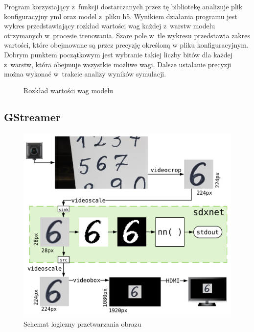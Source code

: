 \documentclass[12pt, oneside, a4paper]{article}
\begin{document}
Program korzystający z~funkcji dostarczanych przez tę bibliotekę
analizuje plik konfiguracyjny yml oraz model z~pliku h5.
Wynikiem działania programu jest wykres przedstawiający
rozkład wartości wag każdej z~warstw modelu otrzymanych w~procesie trenowania.
Szare pole w~tle wykresu
przedstawia zakres wartości, które obejmowane są przez precyzję określoną
w pliku konfiguracyjnym. Dobrym punktem początkowym jest wybranie takiej
liczby bitów dla każdej z~warstw, która obejmuje wszystkie możliwe wagi.
Dalsze ustalanie precyzji można wykonać w~trakcie analizy wyników
symulacji.
\begin{figure}[H]
  
  \caption{Rozkład wartości wag modelu}\label{fig:weights_dist}
  \centering
\end{figure}


\subsection{GStreamer}
\begin{figure}[h]
  \centering
  \includegraphics[width=\linewidth]{figures/image_flow.png}
  \caption{Schemat logiczny przetwarzania obrazu}\label{fig:image_flow}
\end{figure}
\end{document}
